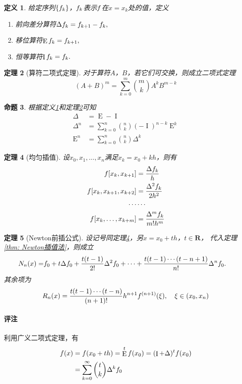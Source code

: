 \documentclass[12pt, a4paper]{article}
\theoremstyle{margin}
\newtheorem{thm}{定理}
\newtheorem{pos}[thm]{命题}
\newtheorem{defi}[thm]{定义}
\DeclareMathOperator{\sft}{E}
\DeclareMathOperator{\idt}{I}
\newcommand{\f}{\mathnormal{f}}
\newcommand{\R}{\mathbf{R}}
\newcommand\thmref[1]{定理\ref{#1}}
\newcommand\defref[1]{定义\ref{#1}}
\newcommand{\remark}{\paragraph{评注}}
\begin{document}
  \begin{defi}
    \label{def: 算符}
    给定序列$\{\f_k\}$，$\f_k$表示$\f$在$x=x_k$处的值，定义
    \begin{enumerate}
      \item 前向差分算符$\Delta\f_k = \f_{k+1} - \f_k,$
      \item 移位算符$\sft\f_k = \f_{k+1},$
      \item 恒等算符$\idt\f_k = \f_k.$
    \end{enumerate}
  \end{defi}

  \begin{thm}[算符二项式定理]
    \label{thm: 算符二项式定理}
    对于算符$A$，$B$，若它们可交换，则成立二项式定理
    \[
      (A+B)^m = \sum_{k=0}^m \binom{m}{k} A^kB^{m-k}
    \]
  \end{thm}

  \begin{pos}
    根据\defref{def: 算符}和\thmref{thm: 算符二项式定理}可知
    \[\begin{split}
      \Delta &= \sft - \idt \\
      \Delta^n &= \sum_{k=0}^n\binom{n}{k}(-\idt)^{n-k}\sft^k \\
      \sft^n &= \sum_{k=0}^n\binom{n}{k}\Delta^k
    \end{split}\]
  \end{pos}

  \begin{thm}[均匀插值]
    \label{thm: 均匀插值}
    设$x_0,x_1,\dots,x_n$满足$x_k = x_0 + kh$，则有
    \[\begin{split}
      \f[x_k, x_{k+1}] &= \frac{\Delta\f_k}{h} \\
      \f[x_k, x_{k+1}, x_{k+2}] &=
      \frac{\Delta^2\f_k}{2h^2} \\
      \cdots & \cdots \\
      \f[x_k, \dots,x_{k+m}] &=
      \frac{\Delta^m\f_k}{m!h^m} \\
    \end{split}\]
  \end{thm}

  \begin{thm}[Newton前插公式]
    设记号同\thmref{thm: 均匀插值}，另$x = x_0 + th$，$t\in\R$，
    代入\thmref{thm: Newton插值法}，则成立
    \[\begin{split}
      N_n(x) =& \f_0 + t\Delta\f_0 + \frac{t(t-1)}{2!}\Delta^2\f_0 + \cdots + \frac{t(t-1)\cdots(t-n+1)}{n!}\Delta^n\f_0.
    \end{split}\]
    其余项为
    \[
      R_n(x) = \frac{t(t-1)\cdots(t-n)}{(n+1)!}h^{n+1}\f^{(n+1)}(\xi),
      \quad \xi\in(x_0, x_n)
    \]
  \end{thm}
  \remark
    利用广义二项式定理，有
    \[\begin{split}
      \f(x) &= \f(x_0 + th) = \sft^t\f(x_0) = (\idt+\Delta)^t\f(x_0) \\
      &= \sum_{k=0}^\infty\binom{t}{k}\Delta^k\f_0
    \end{split}\]
\end{document}
